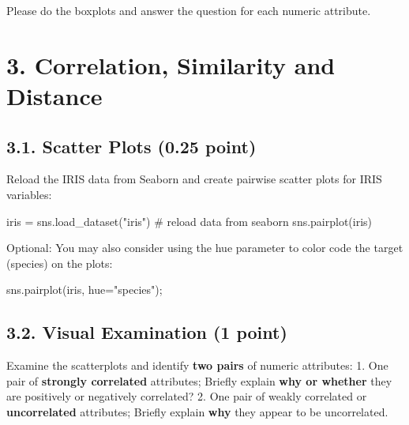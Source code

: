 \documentclass[
  letterpaper,
]{scrbook}
\newenvironment{Shaded}{\begin{snugshade}}{\end{snugshade}}
\newcommand{\CommentTok}[1]{\textcolor[rgb]{0.37,0.37,0.37}{#1}}
\newcommand{\NormalTok}[1]{\textcolor[rgb]{0.00,0.23,0.31}{#1}}
\newcommand{\OperatorTok}[1]{\textcolor[rgb]{0.37,0.37,0.37}{#1}}
\newcommand{\StringTok}[1]{\textcolor[rgb]{0.13,0.47,0.30}{#1}}
\begin{document}
Please do the boxplots and answer the question for each numeric
attribute.

\section*{3. Correlation, Similarity and
Distance}\label{correlation-similarity-and-distance}


\subsection*{3.1. Scatter Plots (0.25
point)}\label{scatter-plots-0.25-point}

Reload the IRIS data from Seaborn and create pairwise scatter plots for
IRIS variables:

\begin{Shaded}
\begin{Highlighting}[]
\NormalTok{iris }\OperatorTok{=}\NormalTok{ sns.load\_dataset(}\StringTok{"iris"}\NormalTok{)   }\CommentTok{\# reload data from seaborn}
\NormalTok{sns.pairplot(iris)}
\end{Highlighting}
\end{Shaded}

Optional: You may also consider using the hue parameter to color code
the target (species) on the plots:

\begin{Shaded}
\begin{Highlighting}[]
\NormalTok{sns.pairplot(iris, hue}\OperatorTok{=}\StringTok{"species"}\NormalTok{)}\OperatorTok{;}
\end{Highlighting}
\end{Shaded}

\subsection*{3.2. Visual Examination (1
point)}\label{visual-examination-1-point}

Examine the scatterplots and identify \textbf{two pairs} of numeric
attributes: 1. One pair of \textbf{strongly correlated} attributes;
Briefly explain \textbf{why or whether} they are positively or
negatively correlated? 2. One pair of weakly correlated or
\textbf{uncorrelated} attributes; Briefly explain \textbf{why} they
appear to be uncorrelated.
\end{document}
